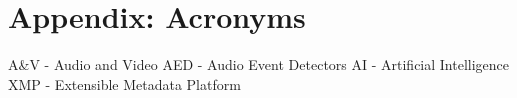 \chapter{Appendix: Acronyms}
\label{app:a}

A\&V - Audio and Video \newline
AED - Audio Event Detectors \newline
AI - Artificial Intelligence \newline
XMP - Extensible Metadata Platform 